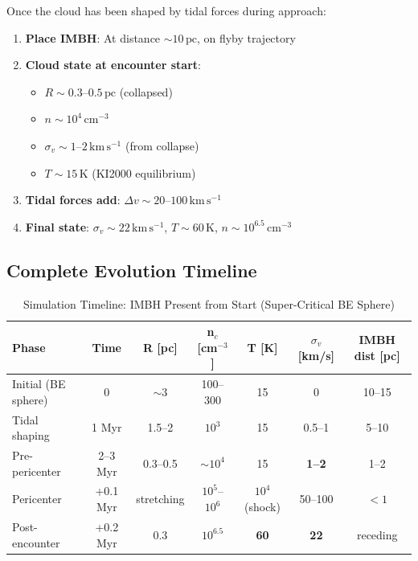 \documentclass[11pt,a4paper]{article}
\newcommand{\kms}{\,\mathrm{km\,s^{-1}}}
\newcommand{\pc}{\,\mathrm{pc}}
\newcommand{\cmcubed}{\,\mathrm{cm^{-3}}}
\begin{document}
Once the cloud has been shaped by tidal forces during approach:

\begin{enumerate}
    \item \textbf{Place IMBH}: At distance $\sim 10\pc$, on flyby trajectory
    \item \textbf{Cloud state at encounter start}:
    \begin{itemize}
        \item $R \sim 0.3$--$0.5\pc$ (collapsed)
        \item $n \sim 10^4\cmcubed$
        \item $\sigma_v \sim 1$--$2\kms$ (from collapse)
        \item $T \sim 15\,\mathrm{K}$ (KI2000 equilibrium)
    \end{itemize}
    \item \textbf{Tidal forces add}: $\Delta v \sim 20$--$100\kms$
    \item \textbf{Final state}: $\sigma_v \sim 22\kms$, $T \sim 60\,\mathrm{K}$, $n \sim 10^{6.5}\cmcubed$
\end{enumerate}

\subsection{Complete Evolution Timeline}

\begin{table}[h]
\centering
\caption{Simulation Timeline: IMBH Present from Start (Super-Critical BE Sphere)}
\begin{tabular}{lcccccc}
\toprule
\textbf{Phase} & \textbf{Time} & \textbf{R [pc]} & \textbf{n$_c$ [cm$^{-3}$]} & \textbf{T [K]} & \textbf{$\sigma_v$ [km/s]} & \textbf{IMBH dist [pc]} \\
\midrule
Initial (BE sphere) & 0 & $\sim 3$ & 100--300 & 15 & 0 & 10--15 \\
Tidal shaping & 1 Myr & 1.5--2 & $10^3$ & 15 & 0.5--1 & 5--10 \\
Pre-pericenter & 2--3 Myr & 0.3--0.5 & $\sim 10^4$ & 15 & \textbf{1--2} & 1--2 \\
\midrule
Pericenter & +0.1 Myr & stretching & $10^5$--$10^6$ & $10^4$ (shock) & 50--100 & $<1$ \\
Post-encounter & +0.2 Myr & 0.3 & $10^{6.5}$ & \textbf{60} & \textbf{22} & receding \\
\bottomrule
\end{tabular}
\end{table}
\end{document}
